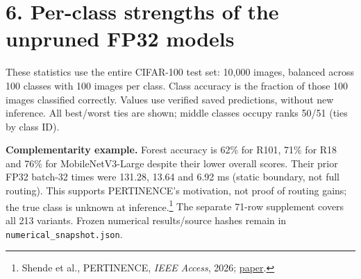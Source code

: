 \section*{6. Per-class strengths of the unpruned FP32 models}
These statistics use the entire CIFAR-100 test set: 10,000 images, balanced across 100 classes with 100 images per class. Class accuracy is the fraction of those 100 images classified correctly. Values use verified saved predictions, without new inference. All best/worst ties are shown; middle classes occupy ranks 50/51 (ties by class ID).
\begin{center}\footnotesize\renewcommand{\arraystretch}{1.22}\ClassTable\end{center}
\textbf{Complementarity example.} Forest accuracy is 62\% for R101, 71\% for R18 and 76\% for MobileNetV3-Large despite their lower overall scores. Their prior FP32 batch-32 times were 131.28, 13.64 and 6.92 ms (static boundary, not full routing). This supports PERTINENCE's motivation, not proof of routing gains; the true class is unknown at inference.\footnote{Shende et al., PERTINENCE, \emph{IEEE Access}, 2026; \href{https://doi.org/10.1109/ACCESS.2026.3707342}{paper}.}
{\footnotesize The separate 71-row supplement covers all 213 variants. Frozen numerical results/source hashes remain in \texttt{numerical\_snapshot.json}.}
